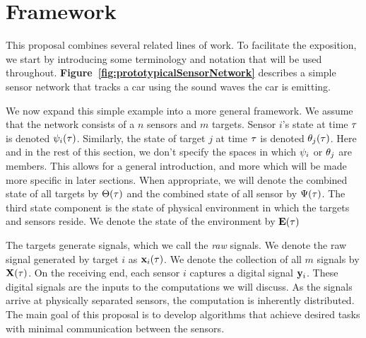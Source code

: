 \section{Framework}\label{sec:Framework}


This proposal combines several related lines of work. To facilitate the exposition, we start by introducing some terminology and notation that will be used throughout. {\bf Figure~\ref{fig:prototypicalSensorNetwork}} describes a simple sensor network that tracks a car using the sound waves the car is emitting.

We now expand this simple example into a more general framework.
We assume that the network consists of a $n$ sensors and $m$ 
targets. Sensor $i$'s state at time $\tau$ is denoted $\psi_i(\tau)$.  Similarly, the state of target $j$ at time $\tau$ is denoted $\theta_j(\tau)$.
Here and in the rest of this section, we don't specify the spaces in which  $\psi_i$ or $\theta_j$ are members. This allows for a general introduction, and more which will be made more specific in later sections. When appropriate, we will denote the combined state of all targets by $\Theta(\tau)$ and the combined state of all sensor by $\Psi(\tau)$. The third state component is the state of physical environment in which the targets and sensors reside. We denote the state of the environment by $\mathbf{E}(\tau)$

The targets generate signals, which we call the {\em raw} signals. We denote the raw signal generated by target $i$ as $\mathbf{x}_i(\tau)$. We denote the collection of all $m$ signals by $\mathbf{X}(\tau)$. On the receiving end, each sensor $i$ captures a digital signal $\mathbf{y}_i$. These digital signals are the inputs to the computations we will discuss. As the signals arrive at physically separated sensors, the computation is inherently distributed. The main goal of this proposal is to develop algorithms that achieve desired tasks with minimal communication between the sensors.


